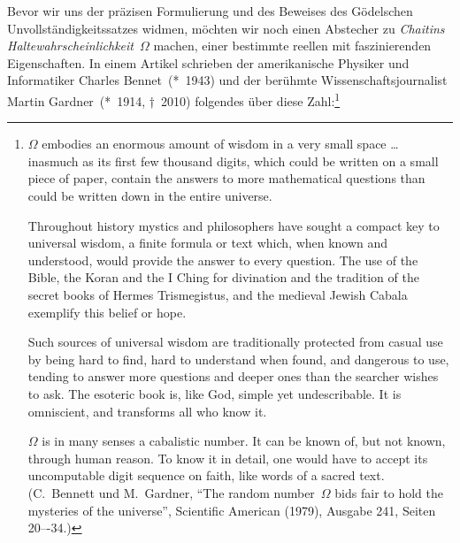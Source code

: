 \documentclass[twoside]{../zirkelblatt1415}
\theoremstyle{definition}
\theoremstyle{plain}
\theoremstyle{remark}
\begin{document}
Bevor wir uns der präzisen Formulierung und des Beweises des Gödelschen
Unvollständigkeitssatzes widmen, möchten wir noch einen Abstecher zu
\emph{Chaitins Haltewahrscheinlichkeit}~$\Omega$ machen, einer bestimmte
reellen mit faszinierenden Eigenschaften. In einem Artikel schrieben der
amerikanische Physiker und Informatiker Charles Bennet~(*~1943) und der
berühmte Wissenschaftsjournalist Martin Gardner~(*~1914, †~2010) folgendes über
diese Zahl:\footnote{$\Omega$ embodies an enormous amount of wisdom in a very
small space \ldots{} inasmuch as its first few thousand digits, which could be
written on a small piece of paper, contain the answers to more mathematical
questions than could be written down in the entire universe.

Throughout history mystics and philosophers have sought a compact
key to universal wisdom, a finite formula or text which, when known and
understood, would provide the answer to every question. The use of the Bible,
the Koran and the I Ching for divination and the tradition of the secret
books of Hermes Trismegistus, and the medieval Jewish Cabala exemplify this
belief or hope.

Such sources of universal wisdom are traditionally protected from casual use
by being hard to find, hard to understand when found, and dangerous to use,
tending to answer more questions and deeper ones than the searcher wishes to
ask. The esoteric book is, like God, simple yet undescribable. It is
omniscient, and transforms all who know it.

$\Omega$ is in many senses a cabalistic number. It can be known of, but not
known, through human reason. To know it in detail, one would have to accept
its uncomputable digit sequence on faith, like words of a sacred text.
(C.~Bennett und M.~Gardner, "`The random number~$\Omega$ bids fair to hold
the mysteries of the universe"', Scientific American (1979), Ausgabe 241,
Seiten 20–-34.)}
\end{document}
